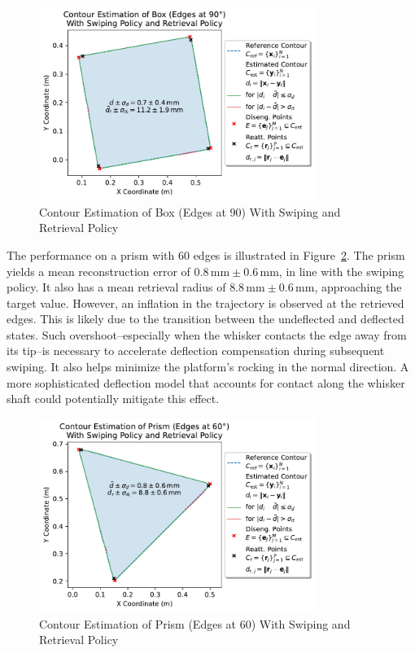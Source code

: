 \begin{figure}[!htb]
    \centering
    \includegraphics[width=0.8\textwidth]{figures/experiments/box-edges-90deg-swiping-retrieval}
    \caption{Contour Estimation of Box (Edges at 90\degree{}) With Swiping and Retrieval Policy}
    \label{fig:experiment-box-edges-90deg-swiping-retrieval}
\end{figure}

The performance on a prism with 60\degree{} edges is illustrated in Figure~\ref{fig:experiment-prism-edges-60deg-swiping-retrieval}.
The prism yields a mean reconstruction error of $0.8\,\text{mm} \pm 0.6\,\text{mm}$, in line with the swiping policy.
It also has a mean retrieval radius of $8.8\,\text{mm} \pm 0.6\,\text{mm}$, approaching the target value.
However, an inflation in the trajectory is observed at the retrieved edges.
This is likely due to the transition between the undeflected and deflected states.
Such overshoot--especially when the whisker contacts the edge away from its tip--is necessary to accelerate deflection compensation during subsequent swiping.
It also helps minimize the platform's rocking in the normal direction.
A more sophisticated deflection model that accounts for contact along the whisker shaft could potentially mitigate this effect.

\begin{figure}[!htb]
    \centering
    \includegraphics[width=0.8\textwidth]{figures/experiments/prism-edges-60deg-swiping-retrieval}
    \caption{Contour Estimation of Prism (Edges at 60\degree{}) With Swiping and Retrieval Policy}
    \label{fig:experiment-prism-edges-60deg-swiping-retrieval}
\end{figure}

